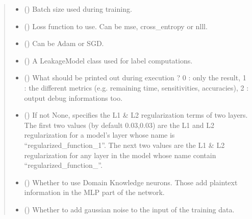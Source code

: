 \documentclass[letterpaper,10pt,english]{sphinxmanual}
\begin{document}
\begin{fulllineitems}
\begin{fulllineitems}
\begin{quote}
\begin{description}
\begin{itemize}
\item {} 
\sphinxAtStartPar
{} () \textendash{} Batch size used during training.

\item {} 
\sphinxAtStartPar
{} () \textendash{} Loss function to use. Can be mse, cross\_entropy or nlll.

\item {} 
\sphinxAtStartPar
{} () \textendash{} Can be Adam or SGD.

\item {} 
\sphinxAtStartPar
{} () \textendash{} A LeakageModel class used for label computations.

\item {} 
\sphinxAtStartPar
{} () \textendash{} What should be printed out during execution ? 0 : only the result,
1 : the different metrics (e.g. remaining time, sensitivities, accuracies),
2 : output debug informations too.

\item {} 
\sphinxAtStartPar
{} (\sphinxstyleliteralemphasis{\sphinxupquote{{[}}}\sphinxstyleliteralemphasis{\sphinxupquote{{]}}}) \textendash{} If not None, specifies the L1 \& L2 regularization terms of two layers.
The first two values (by default 0.03,0.03) are the L1 and L2 regularization
for a model’s layer whose name is “regularized\_function\_1”. The next two values
are the L1 \& L2 regularization for any layer in the model whose name contain
“regularized\_function\_”.

\item {} 
\sphinxAtStartPar
{} () \textendash{} Whether to use Domain Knowledge neurons. Those add plaintext information
in the MLP part of the network.

\item {} 
\sphinxAtStartPar
{} () \textendash{} Whether to add gaussian noise to the input of the training data.


\end{itemize}
\end{description}
\end{quote}
\end{fulllineitems}
\end{fulllineitems}
\end{document}
